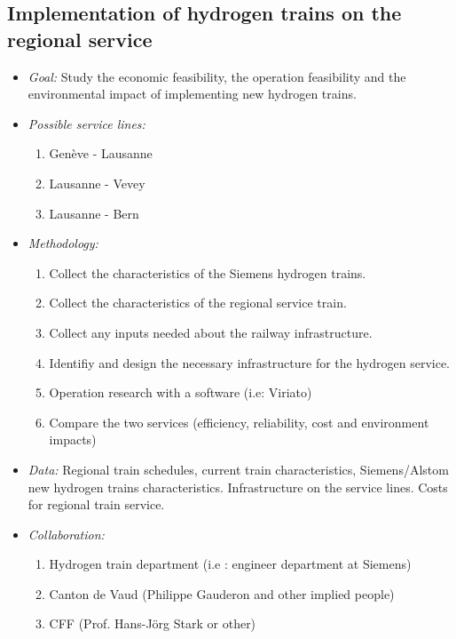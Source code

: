 \documentclass[helv,dvipsnames]{apa7}
\begin{document}
\subsection{Implementation of hydrogen trains on the regional service}
\begin{itemize}
    \itemsep0mm
    \item \textit{Goal:} Study the economic feasibility, the operation feasibility and the environmental impact of implementing new hydrogen trains.
    \item \textit{Possible service lines:}
    \begin{enumerate}
        \itemsep0mm
        \item Genève - Lausanne
        \item Lausanne - Vevey
        \item Lausanne - Bern
    \end{enumerate}
    \item \textit{Methodology:}
    \begin{enumerate}
        \itemsep0mm
        \item Collect the characteristics of the Siemens hydrogen trains.
        \item Collect the characteristics of the regional service train.
        \item Collect any inputs needed about the railway infrastructure.
        \item Identifiy and design the necessary infrastructure for the hydrogen service.
        \item Operation research with a software (i.e: Viriato)
        \item Compare the two services (efficiency, reliability, cost and environment impacts)
    \end{enumerate}
    \item \textit{Data:} Regional train schedules, current train characteristics, Siemens/Alstom new hydrogen trains characteristics. Infrastructure on the service lines. Costs for regional train service. 
    \item \textit{Collaboration:} 
    \begin{enumerate}
        \itemsep 0mm
        \item Hydrogen train department (i.e : engineer department at Siemens)
        \item Canton de Vaud (Philippe Gauderon and other implied people)
        \item CFF (Prof. Hans-Jörg Stark or other)
    \end{enumerate}
\end{itemize}
\newpage
\end{document}
